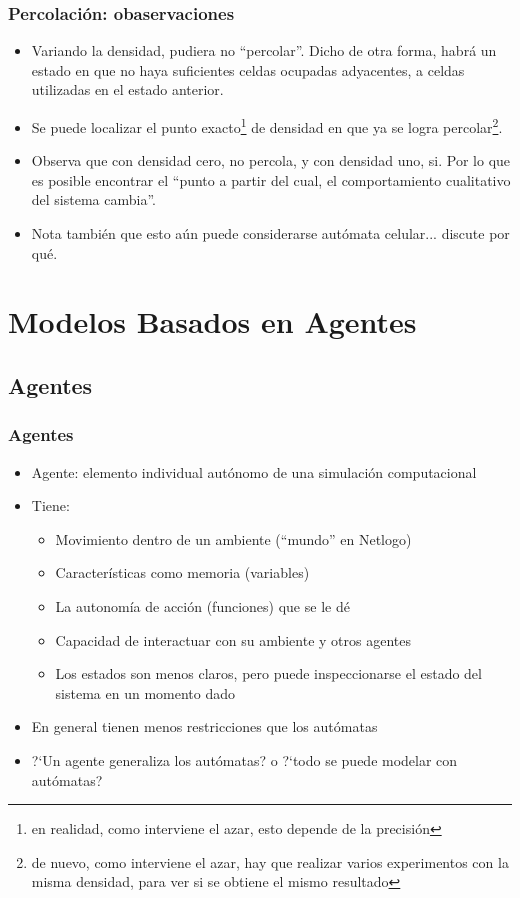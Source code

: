 \documentclass{beamer}
\begin{document}
\begin{frame}[t]
\frametitle{Percolación: obaservaciones}
\begin{itemize}[<+-| alert@+>]
	\item Variando la densidad, pudiera no ``percolar''. Dicho de otra forma, habrá un estado en que no haya suficientes celdas ocupadas adyacentes, a celdas utilizadas en el estado anterior.
	\item Se puede localizar el punto exacto\footnote{en realidad, como interviene el azar, esto depende de la precisión} de densidad en que ya se logra percolar\footnote{de nuevo, como interviene el azar, hay que realizar varios experimentos con la misma densidad, para ver si se obtiene el mismo resultado}.
	\item Observa que con densidad cero, no percola, y con densidad uno, si. Por lo que es posible encontrar el ``punto a partir del cual, el comportamiento cualitativo del sistema cambia''.
	\item Nota también que esto aún puede considerarse autómata celular... discute por qué.
\end{itemize}
\end{frame}

\section{Modelos Basados en Agentes}

\subsection{Agentes}
\begin{frame}[t]
\frametitle{Agentes}
\begin{itemize}[<+-| alert@+>]
	\item Agente: elemento individual autónomo de una simulación computacional
	\item Tiene:
	\begin{itemize}[<+-| alert@+>]
		\item Movimiento dentro de un ambiente (``mundo'' en Netlogo)
		\item Características como memoria (variables)
		\item La autonomía de acción (funciones) que se le dé
		\item Capacidad de interactuar con su ambiente y otros agentes
		\item Los estados son menos claros, pero puede inspeccionarse el estado del sistema en un momento dado
	\end{itemize}
	\item En general tienen menos restricciones que los autómatas
	\item ?`Un agente generaliza los autómatas? o ?`todo se puede modelar con autómatas?
\end{itemize}
\end{frame}
\end{document}
